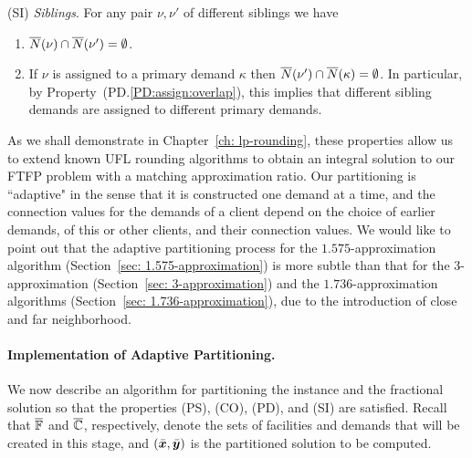 \documentclass[oneside,final]{ucr}
\begin{document}
\begin{description}
\begin{enumerate}
\begin{enumerate}
			\end{enumerate}

	\end{enumerate}
	
\item{(SI)} \emph{Siblings}. For any pair $\nu,\nu'$ of different siblings we have
  \begin{enumerate}

	\item \label{SI:siblings disjoint}
		  ${\overline{N}}(\nu)\cap {\overline{N}}(\nu') = \emptyset$.
		
	\item \label{SI:primary disjoint} If $\nu$ is assigned to a primary demand $\kappa$ then
 		${\overline{N}}(\nu')\cap {\overline{N}}(\kappa) = \emptyset$. In particular, by Property~(PD.\ref{PD:assign:overlap}),
		this implies that different sibling demands are assigned to different primary demands.

	\end{enumerate}
	
\end{description}

As we shall demonstrate in Chapter~\ref{ch: lp-rounding}, these properties allow us
to extend known UFL rounding algorithms to obtain an integral solution
to our FTFP problem with a matching approximation ratio. Our
partitioning is ``adaptive" in the sense that it is constructed one
demand at a time, and the connection values for the demands of a
client depend on the choice of earlier demands, of this or other
clients, and their connection values. We would like to point out that
the adaptive partitioning process for the $1.575$-approximation
algorithm (Section~\ref{sec: 1.575-approximation}) is more subtle than that for 
the $3$-approximation (Section~\ref{sec: 3-approximation}) and the
$1.736$-approximation algorithms (Section~\ref{sec:
  1.736-approximation}), due to the introduction of close and far
neighborhood.


\paragraph{Implementation of Adaptive Partitioning.}
We now describe an algorithm for partitioning the instance
and the fractional solution so that the properties (PS),
(CO), (PD), and (SI) are satisfied.  Recall that
$\overline{\mathbb{F}}$ and $\overline{\mathbb{C}}$, respectively, denote the
sets of facilities and demands that will be created in this
stage, and $(\bar{\boldsymbol{x}},\bar{\boldsymbol{y}})$ is the partitioned solution
to be computed. 
\end{document}
